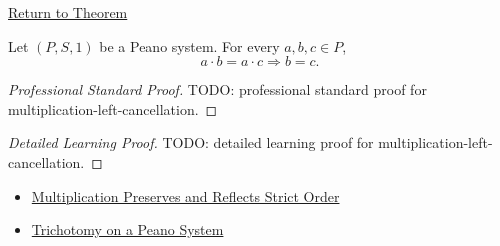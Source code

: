 \newpage
{}
\label{prf:multiplication-left-cancellation}

\begin{remark*}[Return]
\hyperref[thm:multiplication-left-cancellation]{Return to Theorem}
\end{remark*}

\begin{theorem*}
Let $(P,S,1)$ be a Peano system. For every $a,b,c \in P$,
\[
a\cdot b=a\cdot c
\Longrightarrow
b=c.
\]
\end{theorem*}

\begin{proof}[Professional Standard Proof]
\LRAProofBodyStart
TODO: professional standard proof for multiplication-left-cancellation.
\end{proof}

\begin{proof}[Detailed Learning Proof]
\LRAProofBodyStart
TODO: detailed learning proof for multiplication-left-cancellation.
\end{proof}

\begin{remark*}
\end{remark*}

\begin{dependencies}
\begin{itemize}
  \item \hyperref[thm:multiplication-preserves-and-reflects-strict-order]{Multiplication Preserves and Reflects Strict Order}
  \item \hyperref[thm:trichotomy-on-peano-system]{Trichotomy on a Peano System}
\end{itemize}
\end{dependencies}

\clearpage
